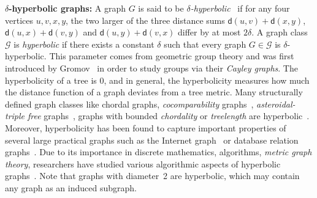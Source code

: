 \documentclass[a4paper]{article}
\newcommand{\dist}[2]{\mathsf{d}\left(#1,#2\right)}
\begin{document}
 \smallskip
 \noindent
\textbf{$\delta$-hyperbolic graphs:} A graph $G$ is said to be \emph{$\delta$-hyperbolic}~\cite{gromov1987} if for any four vertices $u,v,x,y$, the two larger of the three distance sums $\dist{u}{v}+\dist{x}{y}$, $\dist{u}{x}+\dist{v}{y}$ and $\dist{u}{y}+\dist{v}{x}$ differ by at most $2\delta$. A graph class $\mathcal{G}$ is \emph{hyperbolic} if there exists a constant $\delta$ such that every graph $G\in \mathcal{G}$ is $\delta$-hyperbolic. This parameter comes from geometric group theory and  was first introduced by Gromov~\cite{gromov1987} in order to study groups via their \emph{Cayley graphs}. The hyperbolicity of a tree is $0$, and in general, the hyperbolicity measures how much the distance function of a graph deviates from a tree metric.   Many structurally defined graph classes like chordal graphs, \emph{cocomparability} graphs~\cite{corneil2013ldfs}, \emph{asteroidal-triple free} graphs~\cite{corneil1997asteroidal}, graphs with bounded \emph{chordality} or \emph{treelength} are hyperbolic~\cite{chepoi2008diameters,kosowski2015k}. Moreover, hyperbolicity has been found to capture important properties of several large practical graphs such as the Internet graph~\cite{shavitt2004curvature} or database relation graphs~\cite{walter2002interactive}. Due to its importance in discrete mathematics, algorithms, \emph{metric graph theory}, researchers have studied various algorithmic aspects of hyperbolic graphs~\cite{chepoi2008diameters,coudert2021enumeration,chepoi2017core,das2018effect}. Note that graphs with diameter~2 are hyperbolic, which may contain any graph as an induced subgraph.
\end{document}
